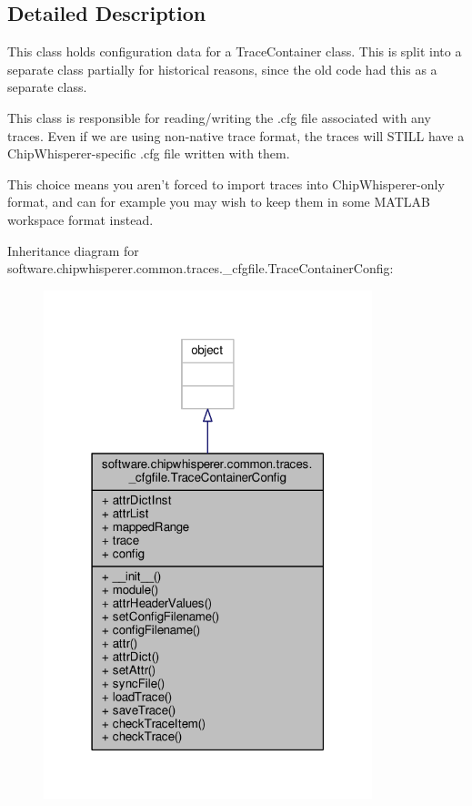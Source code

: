 \subsection{Detailed Description}
\begin{DoxyVerb}This class holds configuration data for a TraceContainer class. This is split into a separate class
partially for historical reasons, since the old code had this as a separate class.

This class is responsible for reading/writing the .cfg file associated with any traces. Even if we are
using non-native trace format, the traces will STILL have a ChipWhisperer-specific .cfg file written
with them.

This choice means you aren't forced to import traces into ChipWhisperer-only format, and can for example
you may wish to keep them in some MATLAB workspace format instead.
\end{DoxyVerb}
 

Inheritance diagram for software.\+chipwhisperer.\+common.\+traces.\+\_\+cfgfile.\+Trace\+Container\+Config\+:\nopagebreak
\begin{figure}[H]
\begin{center}
\leavevmode
\includegraphics[width=271pt]{d5/d83/classsoftware_1_1chipwhisperer_1_1common_1_1traces_1_1__cfgfile_1_1TraceContainerConfig__inherit__graph}
\end{center}
\end{figure}



